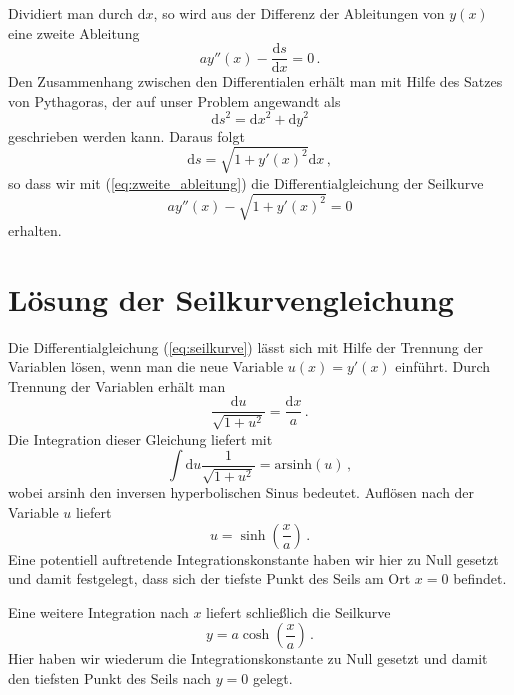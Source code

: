 \documentclass[twocolumn,aps]{revtex4}
\begin{document}
Dividiert man durch $\mathrm{d}x$, so wird aus der Differenz der
Ableitungen von $y(x)$ eine zweite Ableitung
\begin{equation}
 ay''(x)-\frac{\mathrm{d}s}{\mathrm{d}x} = 0\,.
 \label{eq:zweite_ableitung}
\end{equation}
Den Zusammenhang zwischen den Differentialen erhält man mit Hilfe des
Satzes von Pythagoras, der auf unser Problem angewandt als
\begin{equation}
 \mathrm{d}s^2 = \mathrm{d}x^2+\mathrm{d}y^2
\end{equation}
geschrieben werden kann. Daraus folgt
\begin{equation}
 \mathrm{d}s = \sqrt{1+y'(x)^2}\mathrm{d}x\,,
\end{equation}
so dass wir mit (\ref{eq:zweite_ableitung}) die Differentialgleichung
der Seilkurve
\begin{equation}
 ay''(x)-\sqrt{1+y'(x)^2} = 0
 \label{eq:seilkurve}
\end{equation}
erhalten.

\section{Lösung der Seilkurvengleichung}
Die Differentialgleichung (\ref{eq:seilkurve}) lässt sich mit Hilfe der
Trennung der Variablen lösen, wenn man die neue Variable $u(x) = y'(x)$
einführt. Durch Trennung der Variablen erhält man
\begin{equation}
 \frac{\mathrm{d}u}{\sqrt{1+u^2}} = \frac{\mathrm{d}x}{a}\,.
\end{equation}
Die Integration dieser Gleichung liefert mit
\begin{equation}
 \int\mathrm{d}u\frac{1}{\sqrt{1+u^2}} = \mathrm{arsinh}(u)\,,
\end{equation}
wobei arsinh den inversen hyperbolischen Sinus bedeutet. Auflösen nach der
Variable $u$ liefert
\begin{equation}
 u = \sinh\left(\frac{x}{a}\right)\,.
\end{equation}
Eine potentiell auftretende Integrationskonstante haben wir hier zu Null
gesetzt und damit festgelegt, dass sich der tiefste Punkt des Seils am
Ort $x=0$ befindet.

Eine weitere Integration nach $x$ liefert schließlich die Seilkurve
\begin{equation}
 y= a\cosh\left(\frac{x}{a}\right)\,.
\end{equation}
Hier haben wir wiederum die Integrationskonstante zu Null gesetzt und
damit den tiefsten Punkt des Seils nach $y=0$ gelegt.
\end{document}
